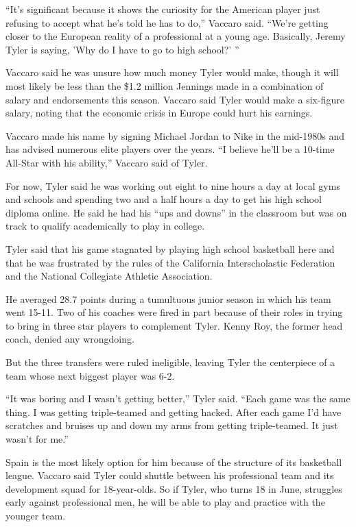 \documentclass[12pt,a4paper,onecolumn]{article}
\begin{document}
``It's significant because it shows the curiosity for the American player just refusing to accept
what he's told he has to do,'' Vaccaro said. ``We're getting closer to the European reality of a
professional at a young age. Basically, Jeremy Tyler is saying, 'Why do I have to go to high
school?' ''

Vaccaro said he was unsure how much money Tyler would make, though it will most likely be less than
the \$1.2 million Jennings made in a combination of salary and endorsements this season. Vaccaro
said Tyler would make a six-figure salary, noting that the economic crisis in Europe could hurt his
earnings.

Vaccaro made his name by signing Michael Jordan to Nike in the mid-1980s and has advised numerous
elite players over the years. ``I believe he'll be a 10-time All-Star with his ability,'' Vaccaro
said of Tyler.

For now, Tyler said he was working out eight to nine hours a day at local gyms and schools and
spending two and a half hours a day to get his high school diploma online. He said he had his ``ups
and downs'' in the classroom but was on track to qualify academically to play in college.

Tyler said that his game stagnated by playing high school basketball here and that he was frustrated
by the rules of the California Interscholastic Federation and the National Collegiate Athletic
Association.

He averaged 28.7 points during a tumultuous junior season in which his team went 15-11. Two of his
coaches were fired in part because of their roles in trying to bring in three star players to
complement Tyler. Kenny Roy, the former head coach, denied any wrongdoing.

But the three transfers were ruled ineligible, leaving Tyler the centerpiece of a team whose next
biggest player was 6-2.

``It was boring and I wasn't getting better,'' Tyler said. ``Each game was the same thing. I was
getting triple-teamed and getting hacked. After each game I'd have scratches and bruises up and down
my arms from getting triple-teamed. It just wasn't for me.''

Spain is the most likely option for him because of the structure of its basketball league. Vaccaro
said Tyler could shuttle between his professional team and its development squad for 18-year-olds.
So if Tyler, who turns 18 in June, struggles early against professional men, he will be able to play
and practice with the younger team.
\end{document}
